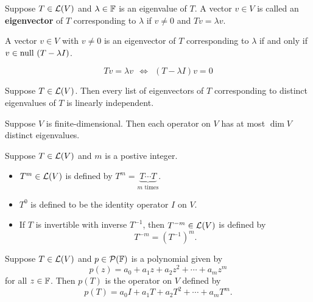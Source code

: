 \documentclass{extarticle}
\begin{document}
\begin{definition}[eigenvector]
    Suppose \(T \in \mathcal{L}(V)\) and \(\lambda \in \mathbb{F}\) is an eigenvalue of \(T\). A vector 
    \(v \in V\) is called an \textbf{eigenvector} of \(T\) corresponding to \(\lambda\)
    if \(v \neq 0\) and \(Tv = \lambda v\). 
\end{definition}

\begin{remark}
    A vector \(v \in V\) with \(v \neq 0\) is an eigenvector of \(T\) corresponding to \(\lambda\)
    if and only if \(v \in \text{null } (T - \lambda I)\). 

    \[Tv = \lambda v \ \ \Leftrightarrow \ \ (T - \lambda I) v = 0\]
\end{remark}


\begin{lemma}
    Suppose \(T \in \mathcal{L}(V)\). Then every list of eigenvectors of \(T\) corresponding to 
    distinct eigenvalues of \(T\) is linearly independent.
\end{lemma}


\begin{thm}
    Suppose \(V\) is finite-dimensional. Then each operator on \(V\) has at most 
    \(\dim V\) distinct eigenvalues. 
\end{thm}


\begin{definition}[\(T^m\)]
    Suppose \(T \in \mathcal{L}(V)\) and \(m\) is a postive integer. 
    \begin{itemize}
        \item \(T^m \in \mathcal{L}(V)\) is defined by \(T^m = \underbrace{T\cdots T}_{m \text{ times}}\).
        \item \(T^0\) is defined to be the identity operator \(I\) on \(V\). 
        \item If \(T\) is invertible with inverse \(T^{-1}\), then \(T^{-m} \in \mathcal{L}(V)\) is defined by 
        \[T^{-m} = (T^{-1})^m.\]
    \end{itemize}
\end{definition}



\begin{definition}[\(p(T)\)]
    Suppose \(T \in \mathcal{L}(V)\) and \(p \in \mathcal{P}(\mathbb{F})\) is a polynomial given by 
    \[p(z) = a_0 + a_1 z + a_2 z^2 + \cdots + a_m z^m\]
    for all \(z \in \mathbb{F}\). Then \(p(T)\) is the operator on \(V\) defined by 
    \[p(T) = a_0I + a_1 T + a_2 T^2 + \cdots + a_m T^m.\]
\end{definition}
\end{document}
